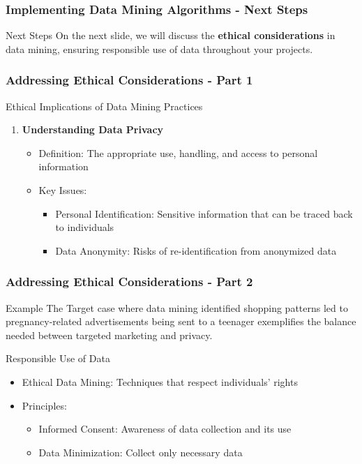 \documentclass{beamer}
\begin{document}
\begin{frame}
    \frametitle{Implementing Data Mining Algorithms - Next Steps}
    \begin{block}{Next Steps}
        On the next slide, we will discuss the \textbf{ethical considerations} in data mining, ensuring responsible use of data throughout your projects.
    \end{block}
\end{frame}

\begin{frame}[fragile]
    \frametitle{Addressing Ethical Considerations - Part 1}
    \begin{block}{Ethical Implications of Data Mining Practices}
        \begin{enumerate}
            \item \textbf{Understanding Data Privacy}
                \begin{itemize}
                    \item Definition: The appropriate use, handling, and access to personal information 
                    \item Key Issues:
                        \begin{itemize}
                            \item Personal Identification: Sensitive information that can be traced back to individuals
                            \item Data Anonymity: Risks of re-identification from anonymized data
                        \end{itemize}
                \end{itemize}
        \end{enumerate}
    \end{block}
\end{frame}

\begin{frame}[fragile]
    \frametitle{Addressing Ethical Considerations - Part 2}
    \begin{exampleblock}{Example}
        The Target case where data mining identified shopping patterns led to pregnancy-related advertisements being sent to a teenager exemplifies the balance needed between targeted marketing and privacy.
    \end{exampleblock}
    
    \begin{block}{Responsible Use of Data}
        \begin{itemize}
            \item Ethical Data Mining: Techniques that respect individuals' rights
            \item Principles:
                \begin{itemize}
                    \item Informed Consent: Awareness of data collection and its use
                    \item Data Minimization: Collect only necessary data
                \end{itemize}
        \end{itemize}
    \end{block}
\end{frame}
\end{document}
